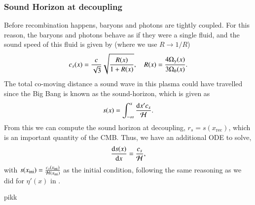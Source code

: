 \subsubsection{Sound Horizon at decoupling} \label{sssec:M2:sound_horizon}
Before recombination happens, baryons and photons are tightly coupled. For this reason, the baryons and photons behave as if they were a single fluid, and the sound speed of this fluid is given by \cite[Eq. (9.21)]{Dodelson} (where we use $R\to 1/R$)
\begin{equation} \label{eq:M2:theory:soundspeed_R_baryons_and_photons}
    c_s(x) = \frac{c}{\sqrt{3}} \sqrt{\frac{R(x)}{1+R(x)}},\quad R(x) = \frac{4\Omega_{\gamma}(x)}{3\Omega_b(x)}.
\end{equation}
The total co-moving distance a sound wave in this plasma could have travelled since the Big Bang is known as the sound-horizon, which is given as 
\begin{equation} \label{eq:M2:theory:sound_horizon_integral}
    s(x)=\int_{-\infty}^x \frac{\dd x' c_s}{\mathcal{H}}.
\end{equation}
From this we can compute the sound horizon at decoupling, $r_s = s(x_\mathrm{rec})$, which is an important quantity of the CMB. Thus, we have an additional ODE to solve, 
\begin{equation} \label{eq:M2:theory:sound_horizon_ODE}
    \dv{s(x)}{x} = \frac{c_s}{\mathcal{H}},
\end{equation}
with $s(x_\mathrm{ini})=\frac{c_s(x_\mathrm{ini})}{\mathcal{H}(x_\mathrm{ini})}$ as the initial condition, following the same reasoning as we did for $\eta'(x)$ in .

pikk